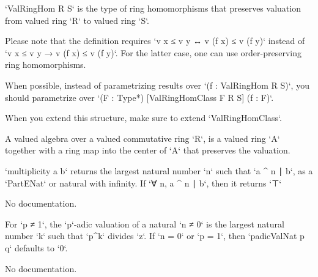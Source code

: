 \begin{definition}\label{ValRingHom}
        \leanok
                `ValRingHom R S` is the type of ring homomorphisms that preserves valuation from valued ring `R` to valued ring `S`.

Please note that the definition requires `v x ≤ v y ↔ v (f x) ≤ v (f y)` instead of `v x ≤ v y → v (f x) ≤ v (f y)`. For the latter case, one can use order-preserving ring homomorphisms.

When possible, instead of parametrizing results over `(f : ValRingHom R S)`,
you should parametrize over `(F : Type*) [ValRingHomClass F R S] (f : F)`.

When you extend this structure, make sure to extend `ValRingHomClass`.
    \end{definition}

\begin{definition}\label{ValAlgebra}
        \leanok
                A valued algebra over a valued commutative ring `R`, is a valued ring `A` together with a ring map into the center of `A` that preserves the valuation.
    \end{definition}

\begin{definition}\label{multiplicity'}
        \leanok
                `multiplicity a b` returns the largest natural number `n` such that
  `a ^ n ∣ b`, as a `PartENat` or natural with infinity. If `∀ n, a ^ n ∣ b`,
  then it returns `⊤`
    \end{definition}

\begin{theorem}\label{finite_nat_iff'}
                No documentation.
    \end{theorem}

\begin{definition}\label{padicValNat'}
        \leanok
                For `p ≠ 1`, the `p`-adic valuation of a natural `n ≠ 0` is the largest natural number `k` such
that `p^k` divides `z`. If `n = 0` or `p = 1`, then `padicValNat p q` defaults to `0`.
    \end{definition}

\begin{theorem}\label{finite_ideal_iff}
                No documentation.
    \end{theorem}

